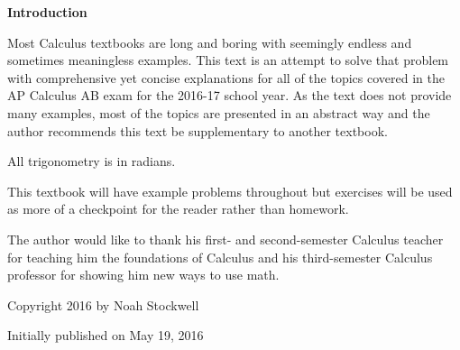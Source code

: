 \par \textbf{Introduction}
\newline
\vspace{0.125in}
\par Most Calculus textbooks are long and boring with seemingly endless and sometimes meaningless examples. This text is an attempt to solve that problem with comprehensive yet concise explanations for all of the topics covered in the AP Calculus AB exam for the 2016-17 school year. As the text does not provide many examples, most of the topics are presented in an abstract way and the author recommends this text be supplementary to another textbook.\\\par All trigonometry is in radians.\\\par This textbook will have example problems throughout but exercises will be used as more of a checkpoint for the reader rather than homework.\\\par The author would like to thank his first- and second-semester Calculus teacher for teaching him the foundations of Calculus and his third-semester Calculus professor for showing him new ways to use math.
\vfill
\par Copyright 2016 by Noah Stockwell
\par Initially published on May 19, 2016